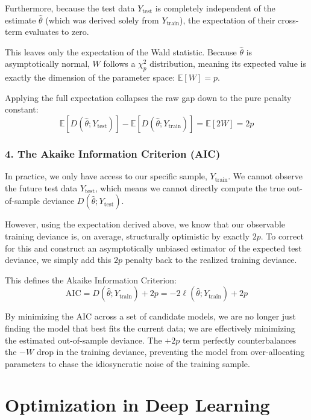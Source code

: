 \documentclass[
  letterpaper,
  DIV=11,
  numbers=noendperiod]{scrreprt}
\renewcommand{\[}{\begin{equation}}
\renewcommand{\]}{\end{equation}}
\theoremstyle{definition}
\theoremstyle{plain}
\theoremstyle{plain}
\theoremstyle{plain}
\theoremstyle{definition}
\theoremstyle{plain}
\theoremstyle{remark}
\begin{document}
Furthermore, because the test data \(Y_{\mathrm{test}}\) is completely
independent of the estimate \(\hat{\theta}\) (which was derived solely
from \(Y_{\mathrm{train}}\)), the expectation of their cross-term
evaluates to zero.

This leaves only the expectation of the Wald statistic. Because
\(\hat{\theta}\) is asymptotically normal, \(W\) follows a \(\chi^2_p\)
distribution, meaning its expected value is exactly the dimension of the
parameter space: \(\mathbb{E}[W] = p\).

Applying the full expectation collapses the raw gap down to the pure
penalty constant: \[
\mathbb{E}[D(\hat{\theta}; Y_{\mathrm{test}})] - \mathbb{E}[D(\hat{\theta}; Y_{\mathrm{train}})] = \mathbb{E}[2W] = 2p
\]

\subsubsection{4. The Akaike Information Criterion
(AIC)}\label{the-akaike-information-criterion-aic}

In practice, we only have access to our specific sample,
\(Y_{\mathrm{train}}\). We cannot observe the future test data
\(Y_{\mathrm{test}}\), which means we cannot directly compute the true
out-of-sample deviance \(D(\hat{\theta}; Y_{\mathrm{test}})\).

However, using the expectation derived above, we know that our
observable training deviance is, on average, structurally optimistic by
exactly \(2p\). To correct for this and construct an asymptotically
unbiased estimator of the expected test deviance, we simply add this
\(2p\) penalty back to the realized training deviance.

This defines the Akaike Information Criterion: \[
\mathrm{AIC} = D(\hat{\theta}; Y_{\mathrm{train}}) + 2p = -2\ell(\hat{\theta}; Y_{\mathrm{train}}) + 2p
\]

By minimizing the AIC across a set of candidate models, we are no longer
just finding the model that best fits the current data; we are
effectively minimizing the estimated out-of-sample deviance. The \(+2p\)
term perfectly counterbalances the \(-W\) drop in the training deviance,
preventing the model from over-allocating parameters to chase the
idiosyncratic noise of the training sample.

\section{Optimization in Deep
Learning}\label{optimization-in-deep-learning}
\end{document}
